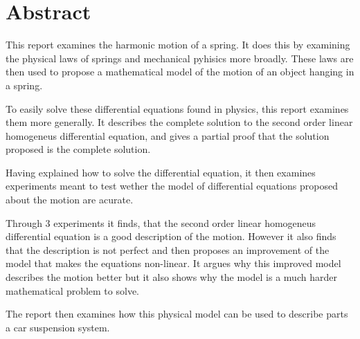 \section*{Abstract}
This report examines the harmonic motion of a spring. 
It does this by examining the physical laws of springs and mechanical pyhisics more broadly. 
These laws are then used to propose a mathematical model of the motion of an object hanging in a spring.

To easily solve these differential equations found in physics, this report examines them more generally. 
It describes the complete solution to the second order linear homogeneus differential equation, and gives a partial proof that the solution proposed is the complete solution. 

Having explained how to solve the differential equation, it then examines experiments meant to test wether the model of differential equations proposed about the motion are acurate.

Through 3 experiments it finds, that the second order linear homogeneus differential equation is a good description of the motion.
However it also finds that the description is not perfect and then proposes an improvement of the model that makes the equations non-linear.
It argues why this improved model describes the motion better but it also shows why the model is a much harder mathematical problem to solve. 

The report then examines how this physical model can be used to describe parts a car suspension system. 

